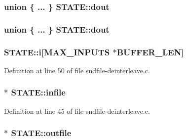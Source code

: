 \subsubsection[{\texorpdfstring{dout}{dout}}]{\setlength{\rightskip}{0pt plus 5cm}union \{ ... \}   S\+T\+A\+T\+E\+::dout}\hypertarget{struct_s_t_a_t_e_a4679c3589c8635c0f7ed3fad181ed908}{}\label{struct_s_t_a_t_e_a4679c3589c8635c0f7ed3fad181ed908}
\subsubsection[{\texorpdfstring{dout}{dout}}]{\setlength{\rightskip}{0pt plus 5cm}union \{ ... \}   S\+T\+A\+T\+E\+::dout}\hypertarget{struct_s_t_a_t_e_ae31eb8dbcd69f7d06699e044a87fb96b}{}\label{struct_s_t_a_t_e_ae31eb8dbcd69f7d06699e044a87fb96b}
\subsubsection[{\texorpdfstring{i}{i}}]{ S\+T\+A\+T\+E\+::i\mbox{[}{\bf M\+A\+X\+\_\+\+I\+N\+P\+U\+TS} $\ast${\bf B\+U\+F\+F\+E\+R\+\_\+\+L\+EN}\mbox{]}}\hypertarget{struct_s_t_a_t_e_ae54a2980cada12bc913f4e7490303a7d}{}\label{struct_s_t_a_t_e_ae54a2980cada12bc913f4e7490303a7d}


Definition at line 50 of file sndfile-\/deinterleave.\+c.

\subsubsection[{\texorpdfstring{infile}{infile}}]{ $\ast$ S\+T\+A\+T\+E\+::infile}\hypertarget{struct_s_t_a_t_e_a643e9bb7ddce734acf826199a7d5e3d7}{}\label{struct_s_t_a_t_e_a643e9bb7ddce734acf826199a7d5e3d7}


Definition at line 45 of file sndfile-\/deinterleave.\+c.

\subsubsection[{\texorpdfstring{outfile}{outfile}}]{ $\ast$ S\+T\+A\+T\+E\+::outfile}\hypertarget{struct_s_t_a_t_e_a8161c6dc82d05b454ebaa8715579d880}{}\label{struct_s_t_a_t_e_a8161c6dc82d05b454ebaa8715579d880}


